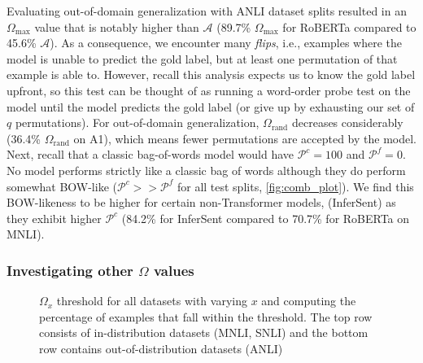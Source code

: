 \documentclass[letterpaper, 12pt]{report}
\begin{document}
Evaluating out-of-domain generalization with ANLI dataset splits resulted in an $\Omega_{\text{max}}$ value that is notably higher than $\mathcal{A}$ (89.7\% $\Omega_{\text{max}}$ for RoBERTa compared to 45.6\% $\mathcal{A}$). As a consequence, we encounter many \textit{flips}, i.e., examples where the model is unable to predict the gold label, but at least one permutation of that example is able to. However, recall this analysis expects us to know the gold label upfront, so this test can be thought of as running a word-order probe test on the model until the model predicts the gold label (or give up by exhausting our set of $q$ permutations). For out-of-domain generalization, $\Omega_{\text{rand}}$ decreases considerably (36.4\% $\Omega_{\text{rand}}$ on A1), which means fewer permutations are accepted by the model. Next, recall that a classic bag-of-words model would have $\mathcal{P}^c=100$ and $\mathcal{P}^f=0$. No model performs strictly like a classic bag of words although they do perform somewhat BOW-like ($\mathcal{P}^c >> \mathcal{P}^f$ for all test splits, \autoref{fig:comb_plot}). %
We find this BOW-likeness to be higher for certain non-Transformer models, (InferSent) as they exhibit higher $\mathcal{P}^c$ (84.2\% for InferSent compared to 70.7\% for RoBERTa on MNLI).






\subsubsection{Investigating other $\Omega$ values}

\begin{figure}
    \centering
    \caption{$\Omega_x$ threshold for all datasets with varying $x$ and computing the percentage of examples that fall within the threshold. The top row consists of in-distribution datasets (MNLI, SNLI) and the bottom row contains out-of-distribution datasets (ANLI)}
    \label{fig:unli:threshold_omega_x}
\end{figure}
\end{document}
